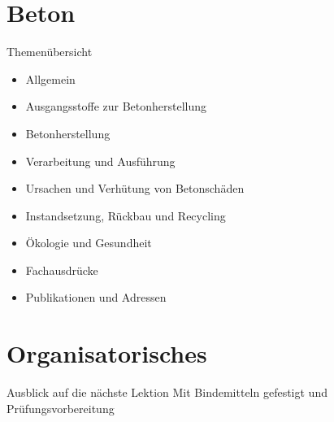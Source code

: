\section{Beton}
\BlueSectionSlide

\begin{frame}{Themenübersicht}
    \begin{itemize}
        \item Allgemein
        \item Ausgangsstoffe zur Betonherstellung
        \item Betonherstellung
        \item Verarbeitung und Ausführung
        \item Ursachen und Verhütung von Betonschäden
        \item Instandsetzung, Rückbau und Recycling
        \item Ökologie und Gesundheit
        \item Fachausdrücke
        \item Publikationen und Adressen
    \end{itemize}
\end{frame}


\section{Organisatorisches}
\BlueSectionSlide





\begin{frame}{Ausblick auf die nächste Lektion}
   Mit Bindemitteln gefestigt und Prüfungsvorbereitung

\end{frame}


